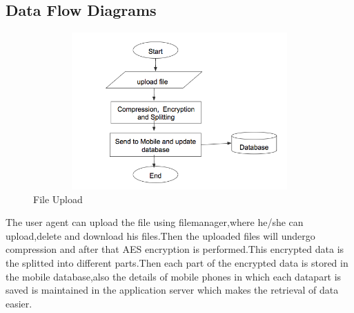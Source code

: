 \documentclass[12pt, a4paper]{article}
\begin{document}
\subsection{Data Flow Diagrams} 
\begin{center}
\begin{figure}[ht!]
    \centering
  \includegraphics[width=15cm,height=6cm,keepaspectratio]{mdsnew.png}
    \caption{File Upload}
    \label{fig:File Upload}
\end{figure}

\end{center}
\vspace{-5mm}
The user agent can upload the file using filemanager,where he/she can upload,delete and download his files.Then the uploaded files will undergo compression and after that AES encryption is performed.This encrypted data is the splitted into different parts.Then each part of the encrypted data is stored in the mobile database,also the details of mobile phones in which each datapart is saved is maintained in the application server which makes the retrieval of data easier.
\end{document}
